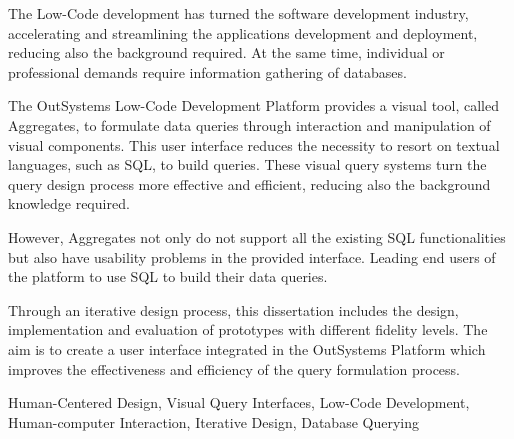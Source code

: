 The Low-Code development has turned the software development industry, accelerating and streamlining the applications development and deployment, reducing also the background required. At the same time, individual or professional demands require information gathering of databases.

The OutSystems Low-Code Development Platform provides a visual tool, called Aggregates, to formulate data queries through interaction and manipulation of visual components. This user interface reduces the necessity to resort on textual languages, such as SQL, to build queries. These visual query systems turn the query design process more effective and efficient, reducing also the background knowledge required.

However, Aggregates not only do not support all the existing SQL functionalities but also have usability problems in the provided interface. Leading end users of the platform to use SQL to build their data queries.

Through an iterative design process, this dissertation includes the design, implementation and evaluation of prototypes with different fidelity levels. The aim is to create a user interface integrated in the OutSystems Platform which improves the effectiveness and efficiency of the query formulation process.


\begin{keywords}
Human-Centered Design, Visual Query Interfaces, Low-Code Development, Human-computer Interaction, Iterative Design, Database Querying
\end{keywords} 

